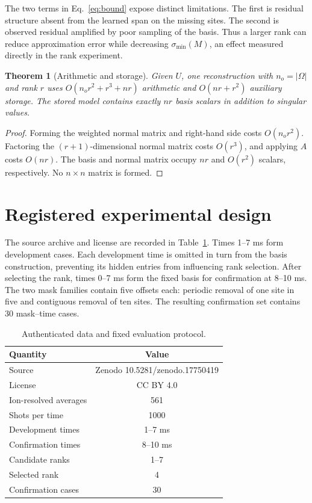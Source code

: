 \documentclass[10pt,letterpaper,twoside]{article}
\newtheorem{theorem}{Theorem}
\begin{document}
The two terms in Eq.~\eqref{eq:bound} expose distinct limitations. The first
is residual structure absent from the learned span on the missing sites. The
second is observed residual amplified by poor sampling of the basis. Thus a
larger rank can reduce approximation error while decreasing
$\sigma_{\min}(M)$, an effect measured directly in the rank experiment.

\begin{theorem}[Arithmetic and storage]
\label{thm:complexity}
Given $U$, one reconstruction with $n_o=|\Omega|$ and rank $r$ uses
$O(n_or^2+r^3+nr)$ arithmetic and $O(nr+r^2)$ auxiliary storage. The stored
model contains exactly $nr$ basis scalars in addition to singular values.
\end{theorem}

\begin{proof}
Forming the weighted normal matrix and right-hand side costs
$O(n_or^2)$. Factoring the $(r+1)$-dimensional normal matrix costs $O(r^3)$,
and applying $A$ costs $O(nr)$. The basis and normal matrix occupy $nr$ and
$O(r^2)$ scalars, respectively. No $n\times n$ matrix is formed.
\end{proof}

\section{Registered experimental design}

The source archive and license are recorded in Table~\ref{tab:data}. Times
1--7 ms form development cases. Each development time is omitted in turn from
the basis construction, preventing its hidden entries from influencing rank
selection. After selecting the rank, times 0--7 ms form the fixed basis for
confirmation at 8--10 ms. The two mask families contain five offsets each:
periodic removal of one site in five and contiguous removal of ten sites. The
resulting confirmation set contains 30 mask--time cases.

\begin{table}[b]
\caption{Authenticated data and fixed evaluation protocol.}
\label{tab:data}
\begin{ruledtabular}
\begin{tabular}{lc}
Quantity & Value\\ \hline
Source & Zenodo 10.5281/zenodo.17750419\\
License & CC BY 4.0\\
Ion-resolved averages & 561\\
Shots per time & 1000\\
Development times & 1--7 ms\\
Confirmation times & 8--10 ms\\
Candidate ranks & 1--7\\
Selected rank & 4\\
Confirmation cases & 30
\end{tabular}
\end{ruledtabular}
\end{table}
\end{document}
